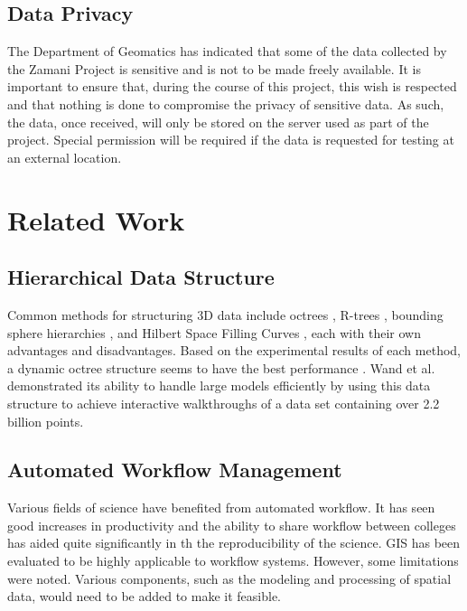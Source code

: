 \documentclass[12pt,a4paper]{article}
\begin{document}
\subsection{Data Privacy}
The Department of Geomatics has indicated that some of the data collected by
the Zamani Project is sensitive and is not to be made freely available. It is
important to ensure that, during the course of this project, this wish is respected
and that nothing is done to compromise the privacy of sensitive data. As such, the
data, once received, will only be stored on the server used as part of the project.
Special permission will be required if the data is requested for testing at an
external location.



\section{Related Work}
\subsection{Hierarchical Data Structure}
Common methods for structuring 3D data include octrees \cite{interactivepointclouds},
R-trees \cite{rtree}, bounding sphere hierarchies \cite{qsplat}, and Hilbert Space
Filling Curves \cite{hilbert}, each with their own advantages and disadvantages. Based
on the experimental results of each method, a dynamic octree structure seems to have
the best performance \cite{interactivepointclouds}. Wand et al. demonstrated its
ability to handle large models efficiently by using this data structure to achieve
interactive walkthroughs of a data set containing over 2.2 billion points.

\subsection{Automated Workflow Management}
Various fields of science have benefited from automated workflow. It has
seen good increases in productivity \cite{Brahe:2007:SWW:1316624.1316661} and the ability to share
workflow between colleges has aided quite significantly in th the reproducibility
of the science\cite{4721191}. GIS has been evaluated to be highly applicable to
workflow systems\cite{migliorini2011workflow}. However, some limitations were noted. Various components, such as the modeling and processing of spatial data,
would need to be added to make it feasible.
\end{document}
